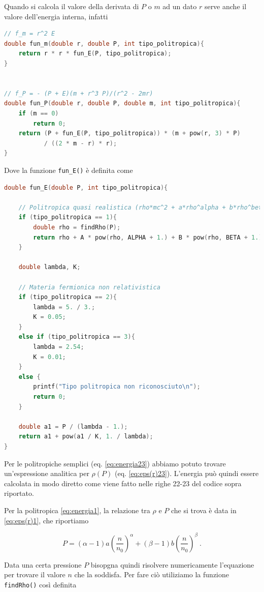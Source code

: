 \documentclass[a4paper, titlepage]{article}
\begin{document}
Quando si calcola il valore della derivata di $P$ o $m$ ad un dato $r$ serve anche il valore dell'energia interna, infatti
\begin{lstlisting}[language=C]
// f_m = r^2 E
double fun_m(double r, double P, int tipo_politropica){
    return r * r * fun_E(P, tipo_politropica);
}


// f_P = - (P + E)(m + r^3 P)/(r^2 - 2mr)
double fun_P(double r, double P, double m, int tipo_politropica){
    if (m == 0)
        return 0;
    return (P + fun_E(P, tipo_politropica)) * (m + pow(r, 3) * P)
           / ((2 * m - r) * r);
}
\end{lstlisting}
Dove la funzione \texttt{fun\_E()} è definita come
\begin{lstlisting}[language=C]
double fun_E(double P, int tipo_politropica){

    // Politropica quasi realistica (rho*mc^2 + a*rho^alpha + b*rho^beta)
    if (tipo_politropica == 1){
        double rho = findRho(P);
        return rho + A * pow(rho, ALPHA + 1.) + B * pow(rho, BETA + 1.);
    }

    double lambda, K;

    // Materia fermionica non relativistica
    if (tipo_politropica == 2){
        lambda = 5. / 3.;
        K = 0.05;
    }
    else if (tipo_politropica == 3){
        lambda = 2.54;
        K = 0.01;
    }
    else {
        printf("Tipo politropica non riconosciuto\n");
        return 0;
    }

    double a1 = P / (lambda - 1.);
    return a1 + pow(a1 / K, 1. / lambda);
}
\end{lstlisting}

Per le politropiche semplici (eq. \ref{eq:energia23}) abbiamo potuto trovare
un'espressione analitica per $\rho (P)$ (eq. \ref{eq:eps(r)23}).
L'energia può quindi essere calcolata in modo diretto come viene fatto nelle
righe 22-23 del codice sopra riportato.

Per la politropica \ref{eq:energia1}, la relazione tra $\rho$ e $P$ che si trova
è data in \ref{eq:eps(r)1}, che riportiamo

\begin{equation}
        P = (\alpha - 1) a \left( \frac{n}{n_0} \right)^{\alpha}
        + (\beta - 1) b \left( \frac{n}{n_0} \right)^{\beta} \ .
        \label{ap:eq:1}
\end{equation}

Data una certa pressione $P$ bisopgna quindi risolvere numericamente l'equazione
per trovare il valore $n$ che la soddisfa.
Per fare ciò utiliziamo la funzione \texttt{findRho()} così definita
\end{document}
